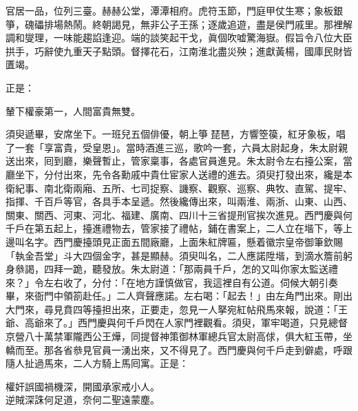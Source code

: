 \begin{myquote}
官居一品，位列三臺。赫赫公堂，潭潭相府。虎符玉節，門庭甲仗生寒；象板銀箏，磈礧排場熱鬧。終朝謁見，無非公子王孫；逐歲追遊，盡是侯門戚里。那裡解調和燮理，一味能趨諂逢迎。端的談笑起干戈，眞個吹嘘驚海嶽。假旨令八位大臣拱手，巧辭使九重天子點頭。督擇花石，江南淮北盡災殃；進獻黃楊，國庫民財皆匱竭。
\end{myquote}

正是：

\begin{myquote}
輦下權豪第一，人間富貴無雙。
\end{myquote}

須臾遞畢，安席坐下。一班兒五個俳優，朝上箏𥱧琵琶，方響箜篌，紅牙象板，唱了一套「享富貴，受皇恩」。當時酒進三巡，歌吟一套，六員太尉起身，朱太尉親送出來，囘到廳，樂聲暫止，管家稟事，各處官員進見。朱太尉令左右擡公案，當廳坐下，分付出來，先令各勳戚中貴仕宦家人送禮的進去。須臾打發出來，纔是本衛紀事、南北衛兩廂、五所、七司捉察、譏察、觀察、巡察、典牧、直駕、提牢、指揮、千百戶等官，各具手本呈遞。然後纔傳出來，叫兩淮、兩浙、山東、山西、關東、關西、河東、河北、福建、廣南、四川十三省提刑官挨次進見。西門慶與何千戶在第五起上，擡進禮物去，管家接了禮帖，鋪在書案上，二人立在堦下，等上邊叫名字。西門慶擡頭見正面五間廠廳，上面朱紅牌匾，懸着徽宗皇帝御筆欽賜「執金吾堂」斗大四個金字，甚是顯赫。須臾叫名，二人應諾陞堦，到滴水簷前躬身叅謁，四拜一跪，聽發放。朱太尉道：「那兩員千戶，怎的又叫你家太監送禮來？」令左右收了，分付：「在地方謹慎做官，我這裡自有公道。伺候大朝引奏畢，來衙門中領箚赴任。」二人齊聲應諾。左右喝：「起去！」由左角門出來。剛出大門來，尋見賁四等擡担出來，正要走，忽見一人拏宛紅帖飛馬來報，說道：「王爺、高爺來了。」西門慶與何千戶閃在人家門裡觀看。須臾，軍牢喝道，只見總督京營八十萬禁軍隴西公王燁，同提督神策御林軍總兵官太尉高俅，俱大紅玉帶，坐轎而至。那各省叅見官員一湧出來，又不得見了。西門慶與何千戶走到僻處，呼跟隨人扯過馬來，二人方騎上馬囘寓。正是：

\begin{myquote}
權奸誤國禍機深，開國承家戒小人。\\逆賊深誅何足道，奈何二聖遠蒙塵。
\end{myquote}

